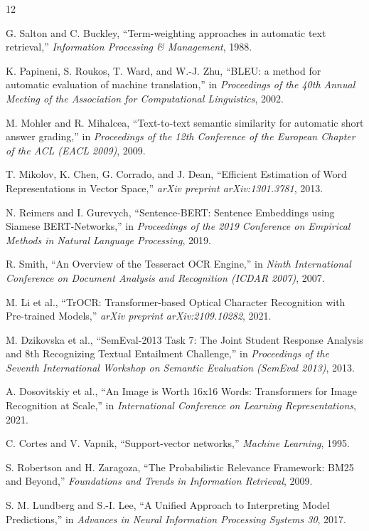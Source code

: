 \documentclass[conference]{IEEEtran}
\begin{document}
\begin{thebibliography}{12}

G. Salton and C. Buckley, ``Term-weighting approaches in automatic text retrieval,'' \textit{Information Processing \& Management}, 1988.

K. Papineni, S. Roukos, T. Ward, and W.-J. Zhu, ``BLEU: a method for automatic evaluation of machine translation,'' in \textit{Proceedings of the 40th Annual Meeting of the Association for Computational Linguistics}, 2002.

M. Mohler and R. Mihalcea, ``Text-to-text semantic similarity for automatic short answer grading,'' in \textit{Proceedings of the 12th Conference of the European Chapter of the ACL (EACL 2009)}, 2009.

T. Mikolov, K. Chen, G. Corrado, and J. Dean, ``Efficient Estimation of Word Representations in Vector Space,'' \textit{arXiv preprint arXiv:1301.3781}, 2013.

N. Reimers and I. Gurevych, ``Sentence-BERT: Sentence Embeddings using Siamese BERT-Networks,'' in \textit{Proceedings of the 2019 Conference on Empirical Methods in Natural Language Processing}, 2019.

R. Smith, ``An Overview of the Tesseract OCR Engine,'' in \textit{Ninth International Conference on Document Analysis and Recognition (ICDAR 2007)}, 2007.

M. Li et al., ``TrOCR: Transformer-based Optical Character Recognition with Pre-trained Models,'' \textit{arXiv preprint arXiv:2109.10282}, 2021.

M. Dzikovska et al., ``SemEval-2013 Task 7: The Joint Student Response Analysis and 8th Recognizing Textual Entailment Challenge,'' in \textit{Proceedings of the Seventh International Workshop on Semantic Evaluation (SemEval 2013)}, 2013.

A. Dosovitskiy et al., ``An Image is Worth 16x16 Words: Transformers for Image Recognition at Scale,'' in \textit{International Conference on Learning Representations}, 2021.

C. Cortes and V. Vapnik, ``Support-vector networks,'' \textit{Machine Learning}, 1995.

S. Robertson and H. Zaragoza, ``The Probabilistic Relevance Framework: BM25 and Beyond,'' \textit{Foundations and Trends in Information Retrieval}, 2009.

S. M. Lundberg and S.-I. Lee, ``A Unified Approach to Interpreting Model Predictions,'' in \textit{Advances in Neural Information Processing Systems 30}, 2017.

\end{thebibliography}
\end{document}
